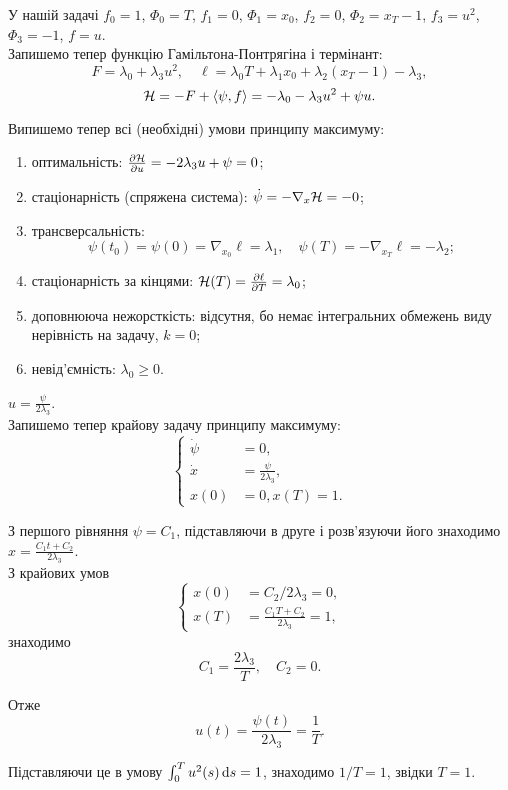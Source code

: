 \begin{solution}
	У нашій задачі $f_0 = 1$, $\Phi_0 = T$, $f_1 = 0$, $\Phi_1 = x_0$, $f_2 = 0$, $\Phi_2 = x_T - 1$, $f_3 = u^2$, $\Phi_3 = -1$, $f = u$. \\

	Запишемо тепер функцію Гамільтона-Понтрягіна і термінант: \[ F = \lambda_0 + \lambda_3 u^2, \quad \ell = \lambda_0 T + \lambda_1 x_0 + \lambda_2 (x_T - 1) - \lambda_3, \] \[ \mathcal{H} = -F + \langle \psi, f \rangle = - \lambda_0 - \lambda_3 u^2 + \psi u. \]

	Випишемо тепер всі (необхідні) умови принципу максимуму:
	\begin{enumerate}
		\item оптимальність: $\frac{\partial \mathcal{H}}{\partial u} = - 2 \lambda_3 u + \psi = 0$;
		\item стаціонарність (спряжена система): $\dot \psi = - \nabla_x \mathcal{H} = - 0$;
		\item трансверсальність: \[\psi(t_0) = \psi(0) = \nabla_{x_0} \ell =  \lambda_1 , \quad \psi(T) = - \nabla_{x_T} \ell = - \lambda_2;\]
		\item стаціонарність за кінцями: $\mathcal{H}(T) = \frac{\partial \ell}{\partial T} = \lambda_0$;
		\item доповнююча нежорсткість: відсутня, бо немає інтегральних обмежень виду нерівність на задачу, $k = 0$;
		\item невід'ємність: $\lambda_0 \ge 0$.
	\end{enumerate}

	$u = \frac{\psi}{2 \lambda_3}$. \\

	Запишемо тепер крайову задачу принципу максимуму: \[ \left\{ \begin{aligned}
		\dot \psi &= 0, \\
		\dot x &= \frac{\psi}{2 \lambda_3}, \\
		x(0) &= 0, x(T) = 1.
	\end{aligned} \right. \]

	З першого рівняння $\psi = C_1$, підставляючи в друге і розв'язуючи його знаходимо $x = \frac{C_1 t + C_2}{2 \lambda_3}$. \\

	З крайових умов \[ \left\{ \begin{aligned}
		x(0) &= C_2 / 2 \lambda_3 = 0, \\
		x(T) &= \frac{C_1 T + C_2}{2 \lambda_3} = 1,
	\end{aligned} \right. \] знаходимо \[C_1 = \frac{2 \lambda_3}{T}, \quad C_2 = 0. \]

	Отже \[ u(t) = \frac{\psi(t)}{2 \lambda_3} = \frac{1}{T}. \]

	Підставляючи це в умову $\int_0^T u^2(s) \mathop{}\!\mathrm{d} s = 1$, знаходимо $1 / T = 1$, звідки $T = 1$.
\end{solution}
